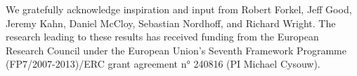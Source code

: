 \begin{refsection}

We gratefully acknowledge inspiration and input from Robert Forkel, Jeff Good, Jeremy Kahn, Daniel McCloy, Sebastian Nordhoff, and Richard Wright. The research leading to these results has received funding from the European Research Council under the European Union's Seventh Framework Programme (FP7/2007-2013)/ERC grant agreement n° 240816 (PI Michael Cysouw).

\printbibliography[heading=subbibliography]
\end{refsection}

